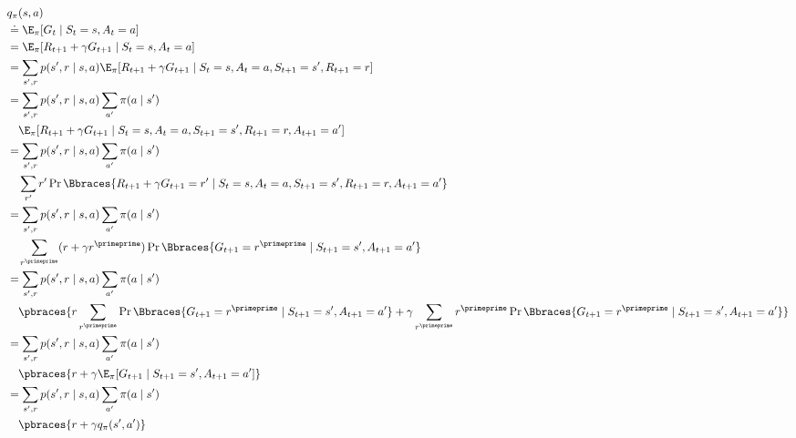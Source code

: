 \begin{solution}

\begin{align*}
    &
    q_\pi(s, a) \\
    & \doteq
    \E_\pi [G_t \mid S_t = s, A_t = a] \\
    & =
    \E_\pi [R_{t+1} + \gamma G_{t+1} \mid S_t = s, A_t = a] \\
    & =
    \sum_{s^\prime, r}
        p(s^\prime, r \mid s, a)
        \E_\pi[R_{t+1} + \gamma G_{t+1} \mid S_t = s, A_t = a, S_{t+1} = s^\prime, R_{t+1} = r] \\
    & =
    \sum_{s^\prime, r}
        p(s^\prime, r \mid s, a)
        \sum_{a^\prime}
            \pi(a \mid s^\prime) \\ & \quad
            \E_\pi[R_{t+1} + \gamma G_{t+1} \mid S_t = s, A_t = a, S_{t+1} = s^\prime, R_{t+1} = r, A_{t+1} = a^\prime] \\
    & =
    \sum_{s^\prime, r}
        p(s^\prime, r \mid s, a)
        \sum_{a^\prime}
            \pi(a \mid s^\prime) \\ & \quad
            \sum_{r^\prime}
                r^\prime
                \Pr \Bbraces{R_{t+1} + \gamma G_{t+1} = r^\prime \mid S_t = s, A_t = a, S_{t+1} = s^\prime, R_{t+1} = r, A_{t+1} = a^\prime} \\
    & =
    \sum_{s^\prime, r}
        p(s^\prime, r \mid s, a)
        \sum_{a^\prime}
            \pi(a \mid s^\prime) \\ & \quad
            \sum_{r^\primeprime}
                (r + \gamma r^\primeprime)
                \Pr \Bbraces{G_{t+1} = r^\primeprime \mid S_{t+1} = s^\prime, A_{t+1} = a^\prime} \\
    & =
    \sum_{s^\prime, r}
        p(s^\prime, r \mid s, a)
        \sum_{a^\prime}
            \pi(a \mid s^\prime) \\ & \quad
            \pbraces
            {
                r
                \sum_{r^\primeprime}
                    \Pr \Bbraces{G_{t+1} = r^\primeprime \mid S_{t+1} = s^\prime, A_{t+1} = a^\prime}
                +
                \gamma 
                \sum_{r^\primeprime}
                    r^\primeprime
                    \Pr \Bbraces{G_{t+1} = r^\primeprime \mid S_{t+1} = s^\prime, A_{t+1} = a^\prime}
            } \\
    & =
    \sum_{s^\prime, r}
        p(s^\prime, r \mid s, a)
        \sum_{a^\prime}
            \pi(a \mid s^\prime) \\ & \quad
            \pbraces
            {
                r
                +
                \gamma 
                \E_\pi[G_{t+1} \mid S_{t+1} = s^\prime, A_{t+1} = a^\prime]
            } \\
    & =
    \sum_{s^\prime, r}
        p(s^\prime, r \mid s, a)
        \sum_{a^\prime}
            \pi(a \mid s^\prime) \\ & \quad
            \pbraces
            {
                r
                +
                \gamma
                q_\pi(s^\prime, a^\prime)
            }
\end{align*}

\end{solution}

